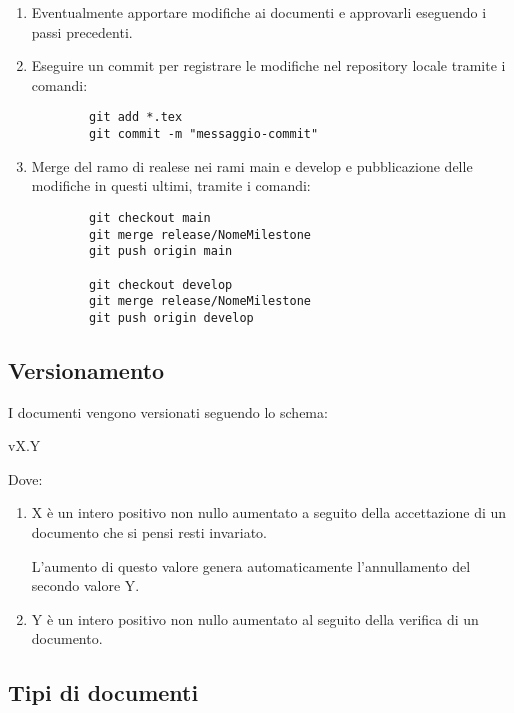 \documentclass[a4paper, 12pt]{article}
\def\ultima-versione{ ULTIMA VERSIONE }
\begin{document}
\begin{enumerate}
\begin{itemize}
        Nella colonna Versione usare la variabile \LaTeX \space chiamata \lstinline|\ultima-versione|.
        Nella colonna Descrizione usare il testo "Approvazione documento".
        Nella colonna data scrivere la data attuale indicando il \underline{mese in lettere}.
    \end{itemize}
   
    \item Eventualmente apportare modifiche ai documenti e approvarli eseguendo i passi precedenti.
    
    \item Eseguire un commit per registrare le modifiche nel repository locale tramite i comandi:
    \begin{lstlisting}
        git add *.tex
        git commit -m "messaggio-commit"
    \end{lstlisting}

    \item Merge del ramo di realese nei rami main e develop e pubblicazione delle modifiche in questi ultimi, tramite i comandi:
    \begin{lstlisting}
        git checkout main 
        git merge release/NomeMilestone
        git push origin main

        git checkout develop
        git merge release/NomeMilestone
        git push origin develop
    \end{lstlisting}
\end{enumerate}

\subsection{Versionamento}
\label{subsec:vers}
I documenti vengono versionati seguendo lo schema:
\begin{center}
    vX.Y 
\end{center}
Dove:
\begin{enumerate}
    \item X è un intero positivo non nullo aumentato a seguito della accettazione di un documento che si pensi resti invariato.
    
    L'aumento di questo valore genera automaticamente l'annullamento del secondo valore Y.

    \item Y è un intero positivo non nullo aumentato al seguito della verifica di un documento.
\end{enumerate}

\subsection{Tipi di documenti}
\label{subsec:docs}
\end{document}
